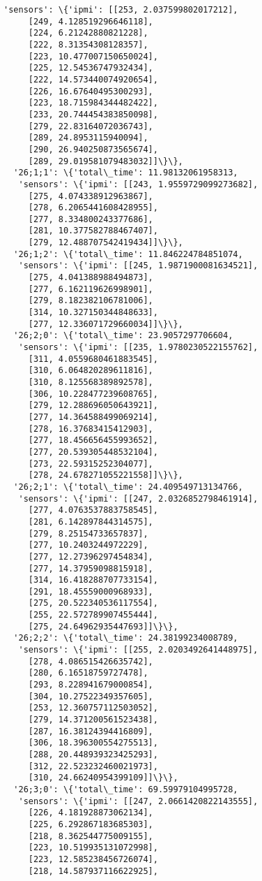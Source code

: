 \documentclass[11pt]{article}
\begin{document}
\begin{tcolorbox}[breakable, size=fbox, boxrule=.5pt, pad at break*=1mm, opacityfill=0]
\begin{Verbatim}[commandchars=\\\{\}]
   'sensors': \{'ipmi': [[253, 2.037599802017212],
     [249, 4.128519296646118],
     [224, 6.21242880821228],
     [222, 8.31354308128357],
     [223, 10.477007150650024],
     [225, 12.54536747932434],
     [222, 14.573440074920654],
     [226, 16.67640495300293],
     [223, 18.715984344482422],
     [233, 20.744454383850098],
     [279, 22.83164072036743],
     [289, 24.8953115940094],
     [290, 26.940250873565674],
     [289, 29.019581079483032]]\}\},
  '26;1;1': \{'total\_time': 11.98132061958313,
   'sensors': \{'ipmi': [[243, 1.9559729099273682],
     [275, 4.074338912963867],
     [278, 6.2065441608428955],
     [277, 8.334800243377686],
     [281, 10.377582788467407],
     [279, 12.488707542419434]]\}\},
  '26;1;2': \{'total\_time': 11.846224784851074,
   'sensors': \{'ipmi': [[245, 1.9871900081634521],
     [275, 4.041388988494873],
     [277, 6.162119626998901],
     [279, 8.182382106781006],
     [314, 10.327150344848633],
     [277, 12.336071729660034]]\}\},
  '26;2;0': \{'total\_time': 23.9057297706604,
   'sensors': \{'ipmi': [[235, 1.9780230522155762],
     [311, 4.0559680461883545],
     [310, 6.064820289611816],
     [310, 8.125568389892578],
     [306, 10.228477239608765],
     [279, 12.288696050643921],
     [277, 14.364588499069214],
     [278, 16.37683415412903],
     [277, 18.456656455993652],
     [277, 20.539305448532104],
     [273, 22.59315252304077],
     [278, 24.678271055221558]]\}\},
  '26;2;1': \{'total\_time': 24.409549713134766,
   'sensors': \{'ipmi': [[247, 2.0326852798461914],
     [277, 4.0763537883758545],
     [281, 6.142897844314575],
     [279, 8.25154733657837],
     [277, 10.2403244972229],
     [277, 12.27396297454834],
     [277, 14.37959098815918],
     [314, 16.418288707733154],
     [291, 18.45559000968933],
     [275, 20.522340536117554],
     [255, 22.572789907455444],
     [275, 24.64962935447693]]\}\},
  '26;2;2': \{'total\_time': 24.38199234008789,
   'sensors': \{'ipmi': [[255, 2.0203492641448975],
     [278, 4.086515426635742],
     [280, 6.16518759727478],
     [293, 8.228941679000854],
     [304, 10.27522349357605],
     [253, 12.360757112503052],
     [279, 14.371200561523438],
     [287, 16.38124394416809],
     [306, 18.396300554275513],
     [288, 20.448939323425293],
     [312, 22.523232460021973],
     [310, 24.66240954399109]]\}\},
  '26;3;0': \{'total\_time': 69.59979104995728,
   'sensors': \{'ipmi': [[247, 2.0661420822143555],
     [226, 4.181928873062134],
     [225, 6.292867183685303],
     [218, 8.362544775009155],
     [223, 10.519935131072998],
     [223, 12.585238456726074],
     [218, 14.587937116622925],

\end{Verbatim}
\end{tcolorbox}
\end{document}
